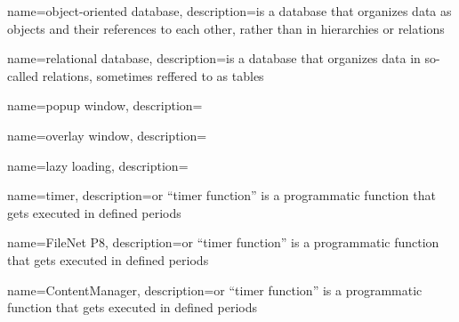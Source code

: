 {
	name=object-oriented database,
	description={is a database that organizes data as objects and their references to each other, rather than in hierarchies or relations}
}

{
	name=relational database,
	description={is a database that organizes data in so-called relations, sometimes reffered to as tables}
}

{
	name=popup window,
	description={}
}

{
	name=overlay window,
	description={}
}

{
	name=lazy loading,
	description={}
}

{
	name=timer,
	description={or ``timer function'' is a programmatic function that gets executed in defined periods}
}

{
	name=FileNet P8,
	description={or ``timer function'' is a programmatic function that gets executed in defined periods}
}

{
	name=ContentManager,
	description={or ``timer function'' is a programmatic function that gets executed in defined periods}
}

